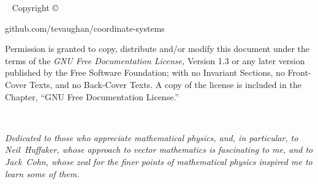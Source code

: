 

\frontmatter

\blankpage

\newpage\thispagestyle{empty}
\vfill
{}

\maketitle

\newpage
\begin{fullwidth}
~\vfill
\thispagestyle{empty}
\setlength{\parindent}{0pt}
\setlength{\parskip}{\baselineskip}
Copyright \copyright\ \the\year\ \thanklessauthor

\par{}

\par{github.com/tevaughan/coordinate-systems}

\par Permission is granted to copy, distribute and/or modify this document
   under the terms of the {\it GNU Free Documentation License,} Version 1.3 or
   any later version published by the Free Software Foundation; with no
   Invariant Sections, no Front-Cover Texts, and no Back-Cover Texts.  A copy
   of the license is included in the Chapter, ``GNU Free Documentation
   License.''

\end{fullwidth}

\tableofcontents



\cleardoublepage
~\vfill
\begin{doublespace}
\noindent\fontsize{18}{22}\selectfont\itshape
\nohyphenation
Dedicated to those who appreciate mathematical physics, and, in particular, to
   \mbox{Neil Huffaker}, whose approach to vector mathematics is fascinating to
   me, and to \mbox{Jack Cohn}, whose zeal for the finer points of mathematical
   physics inspired me to learn some of them.
\end{doublespace}
\vfill
\vfill


